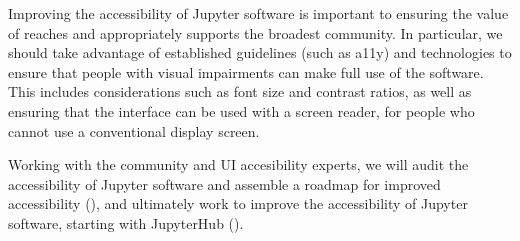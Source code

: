 \begin{task}[
  title=Accessibility in Jupyter,
  id=accessibility,
  lead=SRL,
  PM=12,
  wphases={12-36!.5},
  partners={}
]

  Improving the accessibility of Jupyter software
  is important to ensuring the value of \TheProject reaches and appropriately supports
  the broadest community.
  In particular, we should take advantage of established guidelines (such as a11y) and
  technologies to ensure that people with visual impairments can make full use
  of the software.
  This includes considerations such as font size and contrast ratios,
  as well as ensuring that the interface can be used with a screen reader,
  for people who cannot use a conventional display screen.

  Working with the community and UI accesibility experts, we will audit the accessibility 
  of Jupyter software and assemble a roadmap for improved accessibility
  (),
  and ultimately work to improve the accessibility of Jupyter software,
  starting with JupyterHub ().
\end{task}
